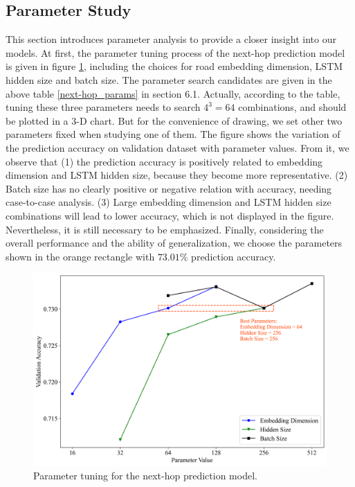 \subsection{Parameter Study}
This section introduces parameter analysis to provide a closer insight into our models. At first, the parameter tuning process of the next-hop prediction model is given in figure \ref{fig: next-hop_param}, including the choices for road embedding dimension, LSTM hidden size and batch size. The parameter search candidates are given in the above table \ref{next-hop_params} in section 6.1. Actually, according to the table, tuning these three parameters needs to search $4^3=64$ combinations, and should be plotted in a 3-D chart. But for the convenience of drawing, we set other two parameters fixed when studying one of them. The figure shows the variation of the prediction accuracy on validation dataset with parameter values. From it, we observe that (1) the prediction accuracy is positively related to embedding dimension and LSTM hidden size, because they become more representative. (2) Batch size has no clearly positive or negative relation with accuracy, needing case-to-case analysis. (3) Large embedding dimension and LSTM hidden size combinations will lead to lower accuracy, which is not displayed in the figure. Nevertheless, it is still necessary to be emphasized. Finally, considering the overall performance and the ability of generalization, we choose the parameters shown in the orange rectangle with $73.01\%$ prediction accuracy.
\begin{figure}[htb]
    \centering
    \includegraphics[width=\textwidth]{images/next-hop_param.png}
    \caption{Parameter tuning for the next-hop prediction model.}
    \label{fig: next-hop_param}
\end{figure}

